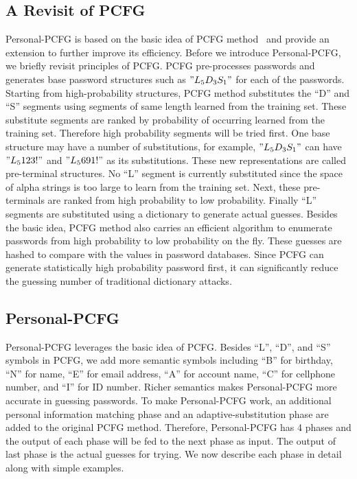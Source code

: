 \subsection{A Revisit of PCFG}
Personal-PCFG is based on the basic idea of PCFG
method~\cite{weir2009password} and provide an extension to further
improve its efficiency. Before we introduce Personal-PCFG, we briefly
revisit principles of PCFG. PCFG pre-processes
passwords and generates base password structures such as $"L_5D_3S_1"$ for each
of the passwords. Starting from high-probability structures, PCFG
method substitutes the ``D'' and ``S'' segments using segments of same
length learned from the training set. These substitute segments are
ranked by probability of occurring learned from the training set. Therefore high
probability segments will be tried first. One base structure may have
a number of substitutions, for example, $"L_5D_3S_1"$ can have
$"L_5123!"$ and $"L_5691!"$ as its substitutions. These new
representations are called pre-terminal structures. No ``L'' segment
is currently substituted since the space of alpha strings is too large
to learn from the training set. Next, these pre-terminals are ranked
from high probability to low probability. Finally ``L'' segments
are substituted using a dictionary to generate actual guesses. 
Besides the basic idea, PCFG
method also carries an efficient algorithm to enumerate passwords from
high probability to low probability on the fly. These
guesses are hashed to compare with the values in password
databases. Since PCFG can generate statistically high probability
password first, it can significantly reduce the guessing number of
traditional dictionary attacks.

\subsection{Personal-PCFG}
Personal-PCFG leverages the basic idea of PCFG. Besides ``L'',
``D'', and ``S'' symbols in PCFG, we add more semantic symbols
including ``B'' for birthday, ``N'' for name, ``E'' for email address,
``A'' for account name, ``C'' for cellphone number, and ``I'' for ID
number. Richer semantics makes Personal-PCFG more accurate in guessing
passwords. To make Personal-PCFG work, an additional personal information matching phase
and an adaptive-substitution phase are added to the original PCFG
method. Therefore, Personal-PCFG has 4 phases and the output of each phase will be fed to the next phase as input. The output of last phase is the actual guesses for trying. We now describe each phase in detail along with simple examples. 

